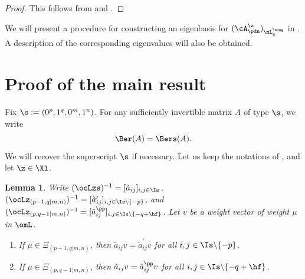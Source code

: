 \documentclass[11pt, reqno]{amsart}
\newtheorem{lem}[thm]{Lemma}
\theoremstyle{definition}
\theoremstyle{remark}
\numberwithin{equation}{section}
\begin{document}
\begin{proof}
This follows from  and \cite[Lemma 1.3]{Lu20}.
\end{proof}

We will present a procedure for constructing an eigenbasis for $(\cA_\pdn^\z)_{\mL^\sing_{\xi}}$ in .
A description of the corresponding eigenvalues will also be obtained.

\section{Proof of the main result} \label{pf}

Fix $\s:=(0^p, 1^q, 0^m, 1^n)$. For any sufficiently invertible matrix $A$ of type $\s$, we write
\begin{equation} \label{drop-s}
\Ber(A)=\Bers(A).
\end{equation}
We will recover the superscript $\s$ if necessary.
Let us keep the notations of , and let $\z \in \Xl$.

\begin{lem}\label{wta}
Write $(\ocLzs)^{-1}=[\tilde{a}_{ij}]_{i,j \in \Is}$, $(\ocLz_{(p-1,q|m,n)})^{-1}=[\tilde{a}^\prime_{ij}]_{i,j \in \Is\backslash\{-p\}}$, and $(\ocLz_{(p,q-1|m,n)})^{-1}=[\tilde{a}^{\pp}_{ij}]_{i,j \in \Is\backslash\{-q+\hf\}}$. Let $v$ be a weight vector of weight $\mu$ in $\omL$.

\begin{enumerate} [\normalfont(i)]

\item If  $\mu \in \Xi_{(p-1,q|m,n)}$, then $\tilde{a}_{ij}v=\tilde{a}^\prime_{ij}v$ for all $i,j \in \Is\backslash\{-p\}$.

\item If  $\mu \in \Xi_{(p,q-1|m,n)}$, then $\tilde{a}_{ij}v=\tilde{a}^\pp_{ij}v$ for all $i,j \in \Is\backslash\{-q+\hf\}$.

\end{enumerate}
\end{lem}
\end{document}
